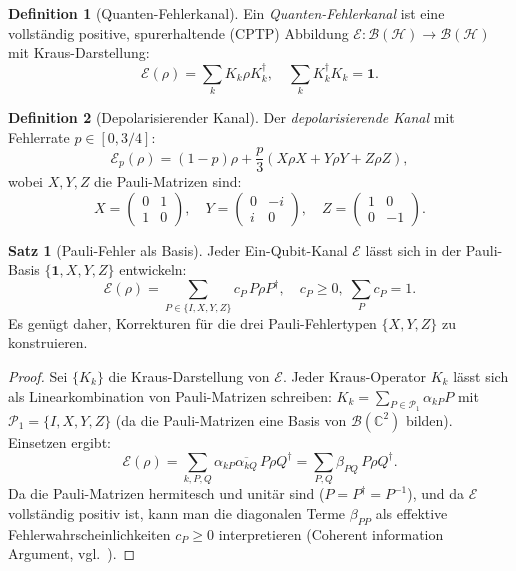 ﻿\documentclass[a4paper,12pt]{article}
\theoremstyle{definition}
\newtheorem{definition}{Definition}
\newtheorem{satz}{Satz}
\newcommand{\Hilbert}{\mathcal{H}}
\begin{document}
\begin{definition}[Quanten-Fehlerkanal]
Ein \emph{Quanten-Fehlerkanal} ist eine vollst\"andig positive,
spurerhaltende (CPTP) Abbildung
$\mathcal{E}: \mathcal{B}(\Hilbert) \to \mathcal{B}(\Hilbert)$ mit
Kraus-Darstellung:
\[
\mathcal{E}(\rho) = \sum_k K_k \rho K_k^\dagger,
\quad \sum_k K_k^\dagger K_k = \mathbf{1}.
\]
\end{definition}

\begin{definition}[Depolarisierender Kanal]
\label{def:depol}
Der \emph{depolarisierende Kanal} mit Fehlerrate $p \in [0, 3/4]$:
\[
\mathcal{E}_p(\rho) = (1-p)\rho + \frac{p}{3}(X\rho X + Y\rho Y + Z\rho Z),
\]
wobei $X, Y, Z$ die Pauli-Matrizen sind:
\[
X = \begin{pmatrix}0&1\\1&0\end{pmatrix},\quad
Y = \begin{pmatrix}0&-i\\i&0\end{pmatrix},\quad
Z = \begin{pmatrix}1&0\\0&-1\end{pmatrix}.
\]
\end{definition}

\begin{satz}[Pauli-Fehler als Basis]
\label{satz:pauli_basis}
Jeder Ein-Qubit-Kanal $\mathcal{E}$ l\"asst sich in der Pauli-Basis
$\{\mathbf{1}, X, Y, Z\}$ entwickeln:
\[
\mathcal{E}(\rho) = \sum_{P \in \{I,X,Y,Z\}} c_P\, P\rho P^\dagger,
\quad c_P \geq 0,\; \sum_P c_P = 1.
\]
Es gen\"ugt daher, Korrekturen f\"ur die drei Pauli-Fehlertypen $\{X, Y, Z\}$
zu konstruieren.
\end{satz}

\begin{proof}
Sei $\{K_k\}$ die Kraus-Darstellung von $\mathcal{E}$.
Jeder Kraus-Operator $K_k$ l\"asst sich als Linearkombination von Pauli-Matrizen
schreiben: $K_k = \sum_{P \in \mathcal{P}_1} \alpha_{kP} P$ mit
$\mathcal{P}_1 = \{I, X, Y, Z\}$ (da die Pauli-Matrizen eine Basis von
$\mathcal{B}(\mathbb{C}^2)$ bilden).
Einsetzen ergibt:
\[
\mathcal{E}(\rho) = \sum_{k,P,Q} \alpha_{kP}\overline{\alpha_{kQ}}\, P\rho Q^\dagger
= \sum_{P,Q} \beta_{PQ}\, P\rho Q^\dagger.
\]
Da die Pauli-Matrizen hermitesch und unit\"ar sind ($P = P^\dagger = P^{-1}$),
und da $\mathcal{E}$ vollst\"andig positiv ist, kann man die diagonalen Terme
$\beta_{PP}$ als effektive Fehlerwahrscheinlichkeiten $c_P \geq 0$ interpretieren
(Coherent information Argument, vgl.~\cite{nielsen2010}).
\end{proof}
\end{document}
